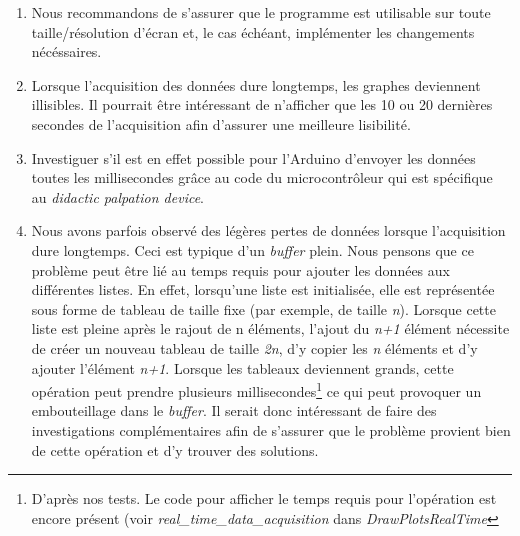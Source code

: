 \begin{enumerate}
    \item Nous recommandons de s'assurer que le programme est utilisable sur toute taille/résolution d'écran et, le cas échéant, implémenter les changements nécéssaires. 
    
    \item Lorsque l'acquisition des données dure longtemps, les graphes deviennent illisibles. Il pourrait être intéressant de n'afficher que les 10 ou 20 dernières secondes de l'acquisition afin d'assurer une meilleure lisibilité.
    
    \item Investiguer s'il est en effet possible pour l'Arduino d'envoyer les données toutes les millisecondes grâce au code du microcontrôleur qui est spécifique au \textit{didactic palpation device}.
    
    \item Nous avons parfois observé des légères pertes de données lorsque l'acquisition dure longtemps. Ceci est typique d'un \textit{buffer} plein. Nous pensons que ce problème peut être lié au temps requis pour ajouter les données aux différentes listes. En effet, lorsqu'une liste est initialisée, elle est représentée sous forme de tableau de taille fixe (par exemple, de taille \textit{n}). Lorsque cette liste est pleine après le rajout de n éléments, l'ajout du \textit{n+1} élément nécessite de créer un nouveau tableau de taille \textit{2n}, d'y copier les \textit{n} éléments et d'y ajouter l'élément \textit{n+1}. Lorsque les tableaux deviennent grands, cette opération peut prendre plusieurs millisecondes\footnote{D'après nos tests. Le code pour afficher le temps requis pour l'opération est encore présent (voir \textit{real\_time\_data\_acquisition} dans \textit{DrawPlotsRealTime}} ce qui peut provoquer un embouteillage dans le \textit{buffer}. Il serait donc intéressant de faire des investigations complémentaires afin de s'assurer que le problème provient bien de cette opération et d'y trouver des solutions.\\
    
    
\end{enumerate}